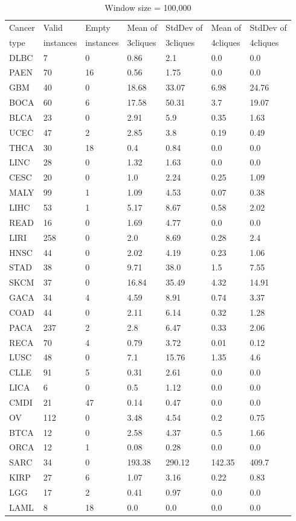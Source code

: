 \documentclass[a4paper,10pt]{article}
\begin{document}
\begin{table}[]
\centering
\caption{Window size = 100,000}
\label{my-label}
\begin{tabular}{l|l|l|l|l|l|l}
Cancer & Valid & Empty & Mean of & StdDev of& Mean of & StdDev of \\ 
type & instances  & instances & 3cliques & 3cliques & 4cliques & 4cliques \\ \hline 
DLBC&7&0&0.86&2.1&0.0&0.0\\
PAEN&70&16&0.56&1.75&0.0&0.0\\
GBM&40&0&18.68&33.07&6.98&24.76\\
BOCA&60&6&17.58&50.31&3.7&19.07\\
BLCA&23&0&2.91&5.9&0.35&1.63\\
UCEC&47&2&2.85&3.8&0.19&0.49\\
THCA&30&18&0.4&0.84&0.0&0.0\\
LINC&28&0&1.32&1.63&0.0&0.0\\
CESC&20&0&1.0&2.24&0.25&1.09\\
MALY&99&1&1.09&4.53&0.07&0.38\\
LIHC&53&1&5.17&8.67&0.58&2.02\\
READ&16&0&1.69&4.77&0.0&0.0\\
LIRI&258&0&2.0&8.69&0.28&2.4\\
HNSC&44&0&2.02&4.19&0.23&1.06\\
STAD&38&0&9.71&38.0&1.5&7.55\\
SKCM&37&0&16.84&35.49&4.32&14.91\\
GACA&34&4&4.59&8.91&0.74&3.37\\
COAD&44&0&2.11&6.14&0.32&1.28\\
PACA&237&2&2.8&6.47&0.33&2.06\\
RECA&70&4&0.79&3.72&0.01&0.12\\
LUSC&48&0&7.1&15.76&1.35&4.6\\
CLLE&91&5&0.31&2.61&0.0&0.0\\
LICA&6&0&0.5&1.12&0.0&0.0\\
CMDI&21&47&0.14&0.47&0.0&0.0\\
OV&112&0&3.48&4.54&0.2&0.75\\
BTCA&12&0&2.58&4.37&0.5&1.66\\
ORCA&12&1&0.08&0.28&0.0&0.0\\
SARC&34&0&193.38&290.12&142.35&409.7\\
KIRP&27&6&1.07&3.16&0.22&0.83\\
LGG&17&2&0.41&0.97&0.0&0.0\\
LAML&8&18&0.0&0.0&0.0&0.0\\

\end{tabular}
\end{table}
\end{document}
